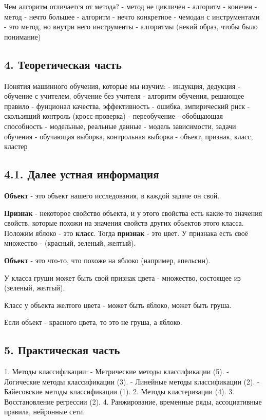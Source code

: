 Чем алгоритм отличается от метода?
- метод не цикличен
- алгоритм - конечен
- метод - нечто большее
- алгоритм - нечто конкретное
- чемодан с инструментами - это метод, но внутри него инструменты -
алгоритмы (некий образ, чтобы было понимание)

\subsection{4. Теоретическая часть}

Понятия машинного обучения, которые мы изучим:
- индукция, дедукция
- обучение с учителем, обучение без учителя
- алгоритм обучения, решающее правило
- фунционал качества, эффективность
- ошибка, эмпирический риск
- скользящий контроль (кросс-проверка)
- переобучение
- обобщающая способность
- модельные, реальные данные
- модель зависимости, задачи обучения
- обучающая выборка, контрольная выборка
- объект, признак, класс, кластер


\subsection{4.1. Далее устная информация}


\textbf{Объект} - это объект нашего исследования, в каждой задаче он свой.

\textbf{Признак} - некоторое свойство объекта, и у этого свойства есть какие-то
значения свойств, которые похожи на значения свойств других объектов этого
класса.
Положим яблоко - это \textbf{класс}. Тогда \textbf{признак} - это цвет. У признака
есть своё множество - (красный, зеленый, желтый).

\textbf{Объект} - это что-то, что похоже на яблоко (например, апельсин).

У класса груши может быть свой признак цвета - множество, состоящее из
(зеленый, желтый).

Класс у объекта желтого цвета - может быть яблоко, может быть груша.

Если объект - красного цвета, то это не груша, а яблоко.

\subsection{5. Практическая часть}

1. Методы классификации:
    - Метрические методы классификации (5).
    - Логические методы классификации (3).
    - Линейные методы классификации (2).
    - Байесовские методы классификации (1).
2. Методы кластеризации (4).
3. Восстановление регрессии (2).
4. Ранжирование, временные ряды, ассоциативные правила, нейронные сети.

